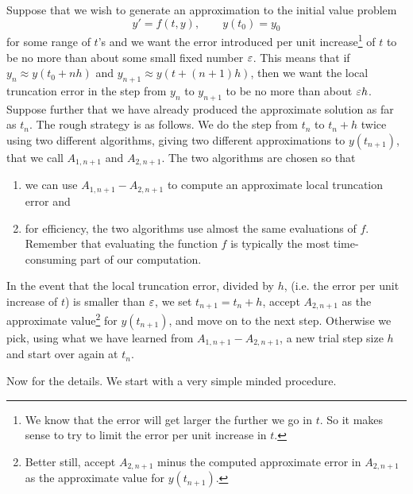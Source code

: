 Suppose that we wish to generate an approximation to the initial value problem
\begin{equation*}
y'=f(t,y),\qquad
y(t_0)=y_0
\end{equation*}
for some range of $t$'s and we want the error introduced per
unit increase\footnote{We know that the error will get larger the
further we go in $t$. So it makes sense to try to limit the error per 
unit increase in $t$.} of $t$ to be no more than about some small fixed 
number $\varepsilon$. This means that if $y_n\approx y(t_0+nh)$ and
$y_{n+1}\approx y(t+(n+1)h)$, then we want the local truncation error in the step from $y_n$ to $y_{n+1}$ to be no more than about $\varepsilon h$. 
Suppose further that we have already produced the approximate solution as 
far as $t_n$. The rough strategy is as follows.
We do the step from $t_n$ to $t_n+h$ twice using two different 
algorithms, giving two different approximations to $y(t_{n+1})$, 
that we call $A_{1,n+1}$ and $A_{2,n+1}$. The two algorithms are chosen so that 
\begin{enumerate}[(1)]\itemsep1pt \parskip0pt  
\item
we can use $A_{1,n+1}-A_{2,n+1}$ to compute an approximate local truncation 
error and
\item
for efficiency, the two algorithms use almost the same evaluations 
of $f$. Remember that evaluating the function $f$ is typically the most time-consuming part of our computation.
\end{enumerate}
In the event that the local truncation error, divided by $h$,
(i.e. the error per unit increase of $t$) is
smaller than $\varepsilon$, we set $t_{n+1}=t_n+h$, accept $A_{2,n+1}$ 
as the approximate value\footnote{Better still, accept $A_{2,n+1}$ minus the computed approximate error in $A_{2,n+1}$ as the approximate value for $y(t_{n+1})$.} for $y(t_{n+1})$, and move on to the next step. Otherwise we 
pick, using what we have learned from $A_{1,n+1}-A_{2,n+1}$, a new trial 
step size $h$ and start over again at $t_n$.

Now for the details.
We start with a very simple minded procedure.


